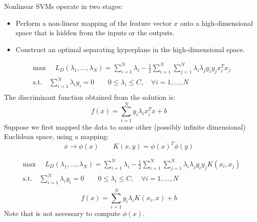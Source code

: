 Nonlinear SVMs operate in two stages:
\begin{itemize}
	\item Perform a non-linear mapping of the feature vector $x$ onto a high-dimensional space that is hidden from the inputs or the outputs.
	\item Construct an optimal separating hyperplane in the high-dimensional space.
\end{itemize}

\begin{equation*}
\begin{aligned}
&\text{max }\quad L_D(\lambda_1,\dots,\lambda_N) = \sum_{i = 1}^{N}\lambda_i - \frac{1}{2}\sum_{i = 1}^{N}\sum_{j = 1}^{N}\lambda_i\lambda_jy_iy_jx_i^Tx_j\\
&\text{s.t.} \quad \sum_{i = 1}^{N}\lambda_iy_i= 0 \qquad 0 \leq \lambda_i \leq C, \quad \forall i = 1,\dots,N\\
\end{aligned}
\end{equation*}
The discriminant function obtained from the solution is:
$$f(x) = \sum\limits_{i = 1}^Ny_i\lambda_ix_i^Tx +b$$
Suppose we first mapped the data to some other (possibly infinite dimensional) Euclidean space, using a mapping:
$$x \rightarrow \phi(x) \qquad K(x,y) = \phi(x)^T\phi(y)$$

\begin{equation*}
\begin{aligned}
&\text{max }\quad L_D(\lambda_1,\dots,\lambda_N) = \sum_{i = 1}^{N}\lambda_i - \frac{1}{2}\sum_{i = 1}^{N}\sum_{j = 1}^{N}\lambda_i\lambda_jy_iy_jK(x_i,x_j)\\
&\text{s.t.} \quad \sum_{i = 1}^{N}\lambda_iy_i= 0 \qquad 0 \leq \lambda_i \leq C, \quad \forall i = 1,\dots,N\\
\end{aligned}
\end{equation*}
$$f(x) = \sum\limits_{i = 1}^Ny_i\lambda_iK(x_i, x) +b$$
Note that is not necessary to compute $\phi(x)$.

